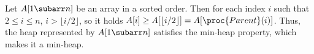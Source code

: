 Let $A[1\subarr n]$ be an array in a sorted order.
Then for each index $i$ such that $2\le i\le n$, $i>\lfloor i/2\rfloor$, so it holds $A[i]\ge A[\lfloor i/2\rfloor]=A[\proc{Parent}(i)]$.
Thus, the heap represented by $A[1\subarr n]$ satisfies the min-heap property, which makes it a min-heap.
